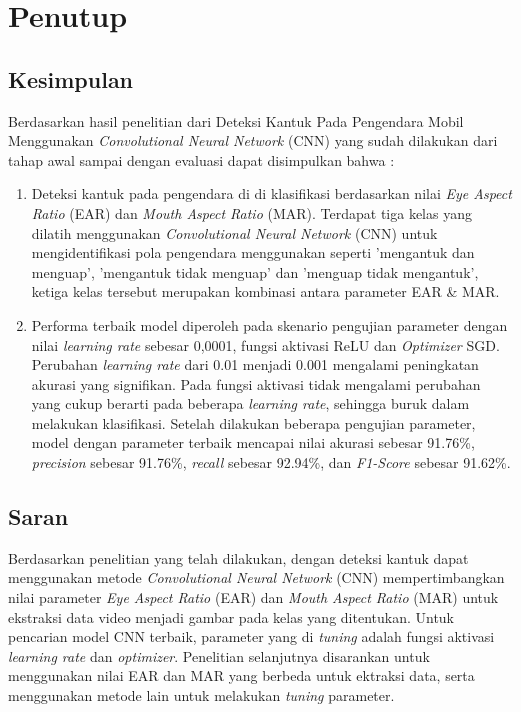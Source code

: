 \chapter{Penutup}

\section{Kesimpulan}

Berdasarkan hasil penelitian dari Deteksi Kantuk Pada Pengendara Mobil 
Menggunakan \textit{Convolutional Neural Network} (CNN) yang sudah 
dilakukan dari tahap awal sampai dengan evaluasi dapat disimpulkan bahwa : 

    \begin{enumerate}
        \item Deteksi kantuk pada pengendara di di klasifikasi berdasarkan nilai \textit{Eye Aspect Ratio} (EAR) dan \textit{Mouth Aspect Ratio} (MAR).
        Terdapat tiga kelas yang dilatih menggunakan \textit{Convolutional Neural Network} (CNN) untuk mengidentifikasi pola pengendara menggunakan seperti ’mengantuk dan menguap’, ’mengantuk tidak menguap’ dan ’menguap tidak mengantuk’, ketiga kelas tersebut merupakan kombinasi antara parameter EAR \& MAR.
        
        \item Performa terbaik model diperoleh pada skenario 
        pengujian parameter dengan nilai \textit{learning rate} 
        sebesar 0,0001, fungsi aktivasi ReLU dan \textit{Optimizer} 
        SGD. Perubahan \textit{learning rate} dari 0.01 menjadi 0.001
         mengalami peningkatan akurasi yang signifikan. Pada
          fungsi aktivasi tidak mengalami perubahan yang cukup berarti pada beberapa \textit{learning rate}, sehingga buruk dalam melakukan klasifikasi. Setelah dilakukan beberapa pengujian parameter, model dengan parameter terbaik mencapai nilai akurasi 
        sebesar 91.76\%, \textit{precision} sebesar 91.76\%, 
        \textit{recall} sebesar 92.94\%, dan \textit{F1-Score} 
        sebesar 91.62\%.
    \end{enumerate}


\section{Saran}

Berdasarkan penelitian yang telah dilakukan, dengan deteksi kantuk 
dapat menggunakan metode \textit{Convolutional Neural Network} (CNN) 
mempertimbangkan nilai parameter \textit{Eye Aspect Ratio} (EAR) 
dan \textit{Mouth Aspect Ratio} (MAR) untuk ekstraksi data video 
menjadi gambar pada kelas yang ditentukan. Untuk pencarian model CNN
 terbaik, parameter yang di \textit{tuning} adalah fungsi aktivasi
  \textit{learning rate} dan \textit{optimizer}. Penelitian selanjutnya disarankan untuk menggunakan nilai EAR dan MAR yang berbeda untuk ektraksi data, serta menggunakan metode lain untuk melakukan \textit{tuning} parameter.








